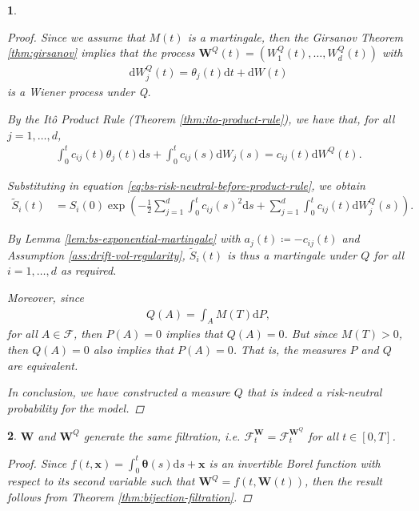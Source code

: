 \documentclass[english]{article}
\newcommand{\comment}[1]{\color{blue}#1\color{black}}
\numberwithin{equation}{section}
\numberwithin{figure}{section}
\theoremstyle{bolddescit}
\newtheorem{theorem}{\protect\theoremname}[section]
\theoremstyle{definition}
\theoremstyle{definition}
\theoremstyle{plain}
\theoremstyle{plain}
\theoremstyle{bolddesc}
\theoremstyle{plain}
\theoremstyle{remark}
\providecommand{\theoremname}{Theorem}
\begin{document}
\begin{theorem}
\begin{proof}
    Since we assume that $M(t)$ is a martingale, then the Girsanov Theorem \ref{thm:girsanov} implies that the process $\mathbf{W}^Q(t) = (W^Q_1(t), \ldots, W^Q_d(t))$ with
    \begin{align*}
      \mathrm{d}W^Q_j(t) = \theta_j(t) \mathrm{d}t + \mathrm{d}W(t)
    \end{align*}
    is a Wiener process under Q.

    By the It\^o Product Rule (Theorem \ref{thm:ito-product-rule}), we have that, for all $j=1,\ldots,d$,
    \begin{align*}
      \int_0^t c_{ij}(t) \theta_j(t) \mathrm{d}s + \int_0^t c_{ij}(s) \mathrm{d}W_j(s)
      = c_{ij}(t) \mathrm{d}W^Q(t).
    \end{align*}

    Substituting in equation \eqref{eq:bs-risk-neutral-before-product-rule}, we obtain
    \begin{align}\label{eq:bs-discounted-stock-price}
      \widetilde{S}_i(t)
      &= S_i(0) \exp \left( - \frac{1}{2} \sum_{j=1}^{d} \int_0^t c_{ij}(s)^2 \mathrm{d}s
      + \sum_{j=1}^d \int_0^t c_{ij}(t) \mathrm{d}W^Q_j(s)\right).
    \end{align}

    By Lemma \ref{lem:bs-exponential-martingale} with $a_j(t) \coloneq - c_{ij}(t)$ and Assumption \ref{ass:drift-vol-regularity}, $\widetilde{S}_i(t)$ is thus a martingale under $Q$ for all $i=1,\ldots,d$ as required.

    Moreover, since
    \begin{align*}
      Q(A) = \int_A M(T) \mathrm{d}P,
    \end{align*}
    for all $A \in \mathcal{F}$, then $P(A) = 0$ implies that $Q(A) = 0$. But since $M(T) > 0$, then $Q(A) = 0$ also implies that $P(A) = 0$. That is, the measures $P$ and $Q$ are equivalent.

    In conclusion, we have constructed a measure $Q$ that is indeed a risk-neutral probability for the model.
  \end{proof}
\end{theorem}

\begin{theorem}
  $\mathbf{W}$ and $\mathbf{W}^Q$ generate the same filtration, i.e. $\mathcal{F}^\mathbf{W}_t = \mathcal{F}^{\mathbf{W}^Q}_t$ for all $t \in [0,T]$.

  \begin{proof}
    Since $f(t, \mathbf{x}) = \int_0^t \mathbf{\theta}(s) \mathrm{d}s + \mathbf{x}$ is an invertible Borel function with respect to its second variable such that $\mathbf{W}^Q = f(t,\mathbf{W}(t))$, then the result follows from Theorem \ref{thm:bijection-filtration}.
  \end{proof}
\end{theorem}
\end{document}
